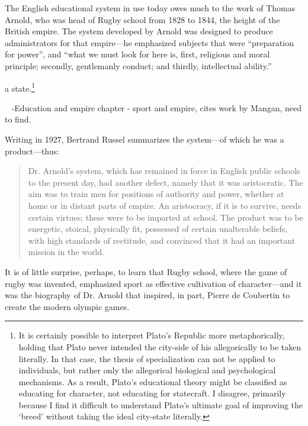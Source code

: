 The English educational system in use today owes much to the work of Thomas Arnold, who was head of Rugby school from 1828 to 1844, the height of the British empire. The system developed by Arnold was designed to produce administrators for that empire---he emphasized subjects that were ``preparation for power'', and ``what we must look for here is, first, religious and moral principle; secondly, gentlemanly conduct; and thirdly, intellectual ability.'' 

a state.\footnote{It is certainly possible to interpret Plato's Republic more metaphorically, holding that Plato never intended the city-side of his allegorically to be taken literally. In that case, the thesis of specialization can not be applied to individuals, but rather only the allegorical biological and psychological mechanisms. As a result, Plato's educational theory might be classified as educating for character, not educating for statecraft. I disagree, primarily because I find it difficult to understand Plato's ultimate goal of improving the `breed' without taking the ideal city-state literally.}

~\citep{McCulloch:2009vz} -Education and empire chapter - sport and empire, cites work by Mangan, need to find.

Writing in 1927, Bertrand Russel summarizes the system---of which he was a product---thus:

\begin{quote}

Dr. Arnold's system, which has remained in force in English public schools to the present day, had another defect, namely that it was aristocratic. The aim was to train men for positions of authority and power, whether at home or in distant parts of empire. An aristocracy, if it is to survive, needs certain virtues; these were to be imparted at school. The product was to be energetic, stoical, physically fit, possessed of certain unalterable beliefs, with high standards of rectitude, and convinced that it had an important mission in the world. ~\citep[P. 53--54]{Russell:GWZfGDU3}
\end{quote}

It is of little surprise, perhaps, to learn that Rugby school, where the game of rugby was invented, emphasized sport as effective cultivation of character---and it was the biography of Dr. Arnold that inspired, in part, Pierre de Coubertin to create the modern olympic games. 


